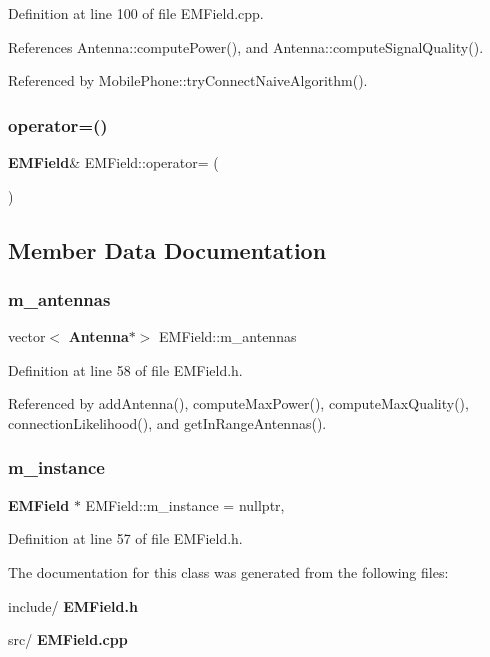 Definition at line 100 of file E\+M\+Field.\+cpp.



References Antenna\+::compute\+Power(), and Antenna\+::compute\+Signal\+Quality().



Referenced by Mobile\+Phone\+::try\+Connect\+Naive\+Algorithm().

\mbox{\label{class_e_m_field_ad35e4754cad2016d7df1b8ac45540b35}} 
\subsubsection{operator=()}
{\footnotesize\ttfamily \textbf{ E\+M\+Field}\& E\+M\+Field\+::operator= (\begin{DoxyParamCaption}\item[{const \textbf{ E\+M\+Field} \&}]{ }\end{DoxyParamCaption})\hspace{0.3cm}{\ttfamily [private]}}



\subsection{Member Data Documentation}
\mbox{\label{class_e_m_field_ab74a3bde70b66fd033bde6c25345a755}} 
\subsubsection{m\_antennas}
{\footnotesize\ttfamily vector$<$\textbf{ Antenna}$\ast$$>$ E\+M\+Field\+::m\+\_\+antennas\hspace{0.3cm}{\ttfamily [private]}}



Definition at line 58 of file E\+M\+Field.\+h.



Referenced by add\+Antenna(), compute\+Max\+Power(), compute\+Max\+Quality(), connection\+Likelihood(), and get\+In\+Range\+Antennas().

\mbox{\label{class_e_m_field_a7aa23feedf709c3d8a0bfc3702a8d5d8}} 
\subsubsection{m\_instance}
{\footnotesize\ttfamily \textbf{ E\+M\+Field} $\ast$ E\+M\+Field\+::m\+\_\+instance = nullptr\hspace{0.3cm}{\ttfamily [static]}, {\ttfamily [private]}}



Definition at line 57 of file E\+M\+Field.\+h.



The documentation for this class was generated from the following files\+:\begin{DoxyCompactItemize}
\item 
include/\textbf{ E\+M\+Field.\+h}\item 
src/\textbf{ E\+M\+Field.\+cpp}\end{DoxyCompactItemize}
